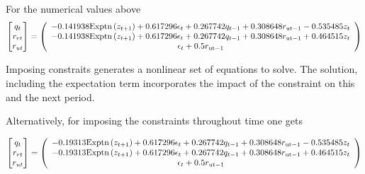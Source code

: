 \documentclass[12pt]{article}
\begin{document}
For the numerical values above
\begin{gather*}
\begin{bmatrix} q_t\\r_{rt}\\r_{ut} \end{bmatrix}=    \left(
   \begin{array}{c}
    -0.141938 \text{Exptn}\left(z_{t+1}\right)+0.617296 \epsilon _t+0.267742
      q_{t-1}+0.308648 r_{\text{ut}-1}-0.535485 z_t \\
    -0.141938 \text{Exptn}\left(z_{t+1}\right)+0.617296 \epsilon _t+0.267742
      q_{t-1}+0.308648 r_{\text{ut}-1}+0.464515 z_t \\
    \epsilon _t+0.5 r_{\text{ut}-1}
   \end{array}
   \right)
\end{gather*}

Imposing constraits generates a nonlinear set of equations to solve.
The solution, including the expectation term incorporates the impact of the
constraint on this and the next period.

Alternatively, for imposing the constraints throughout time one gets

\begin{gather*}
\begin{bmatrix} q_t\\r_{rt}\\r_{ut} \end{bmatrix}=    \left(
   \begin{array}{c}
    -0.19313 \text{Exptn}\left(z_{t+1}\right)+0.617296 \epsilon _t+0.267742
      q_{t-1}+0.308648 r_{\text{ut}-1}-0.535485 z_t \\
    -0.19313 \text{Exptn}\left(z_{t+1}\right)+0.617296 \epsilon _t+0.267742
      q_{t-1}+0.308648 r_{\text{ut}-1}+0.464515 z_t \\
    \epsilon _t+0.5 r_{\text{ut}-1}
   \end{array}
   \right)
\end{gather*}
\end{document}
